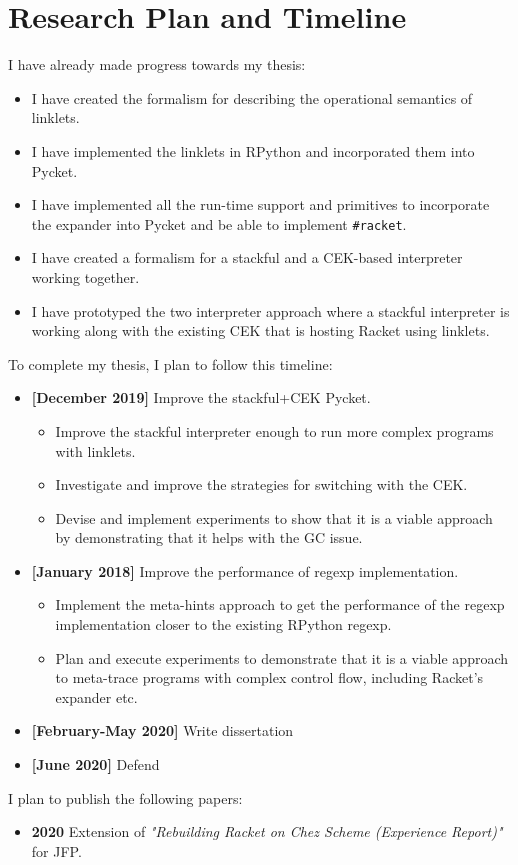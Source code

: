 \section{Research Plan and Timeline}
\label{sec:timeline}

I have already made progress towards my thesis:

\begin{itemize}
\item I have created the formalism for describing the operational
  semantics of linklets.
\item I have implemented the linklets in RPython and incorporated them into
  Pycket.
\item I have implemented all the run-time support and primitives to
  incorporate the expander into Pycket and be able to implement
  \texttt{\#racket}.
\item I have created a formalism for a stackful and a CEK-based
  interpreter working together.
\item I have prototyped the two interpreter approach where a stackful
  interpreter is working along with the existing CEK that is hosting
  Racket using linklets.
\end{itemize}

To complete my thesis, I plan to follow this timeline:

\begin{itemize}
  \item \textbf{[December 2019]} Improve the stackful+CEK Pycket.
    \begin{itemize}
    \item Improve the stackful interpreter enough to run more complex
      programs with linklets.
     \item Investigate and improve the strategies for switching with
       the CEK.
     \item Devise and implement experiments to show that it is a
       viable approach by demonstrating that it helps with the GC
       issue.
    \end{itemize}
  \item \textbf{[January 2018]} Improve the performance of regexp
    implementation.
    \begin{itemize}
      \item Implement the meta-hints approach to get the performance
        of the regexp implementation closer to the existing RPython
        regexp.
      \item Plan and execute experiments to demonstrate that it is a
        viable approach to meta-trace programs with complex control
        flow, including Racket's expander etc.
    \end{itemize}
  \item \textbf{[February-May 2020]} Write dissertation
  \item \textbf{[June 2020]} Defend
\end{itemize}


I plan to publish the following papers:

\begin{itemize}
\item \textbf{2020} Extension of \emph{"Rebuilding Racket on Chez
  Scheme (Experience Report)"} \cite{racket-on-chez-19} for JFP.
\end{itemize}
